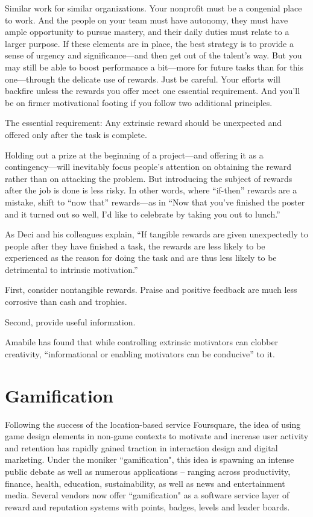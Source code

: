 Similar work for similar organizations. Your nonprofit must be a congenial place to work. And the people on your team must have autonomy, they must have ample opportunity to pursue mastery, and their daily duties must relate to a larger purpose. If these elements are in place, the best strategy is to provide a sense of urgency and significance—and then get out of the talent’s way.
But you may still be able to boost performance a bit—more for future tasks than for this one—through the delicate use of rewards. Just be careful. Your efforts will backfire unless the rewards you offer meet one essential requirement. And you’ll be on firmer motivational footing if you follow two additional principles.

The essential requirement: Any extrinsic reward should be unexpected and offered only after the task is complete.

Holding out a prize at the beginning of a project—and offering it as a contingency—will inevitably focus people’s attention on obtaining the reward rather than on attacking the problem. But introducing the subject of rewards after the job is done is less risky.
In other words, where “if-then” rewards are a mistake, shift to “now that” rewards—as in “Now that you’ve finished the poster and it turned out so well, I’d like to celebrate by taking you out to lunch.”

As Deci and his colleagues explain, “If tangible rewards are given unexpectedly to people after they have finished a task, the rewards are less likely to be experienced as the reason for doing the task and are thus less likely to be detrimental to intrinsic motivation.”

First, consider nontangible rewards. Praise and positive feedback are much less corrosive than cash and trophies.

Second, provide useful information.

Amabile has found that while controlling extrinsic motivators can clobber creativity, “informational or enabling motivators can be conducive” to it.


\section{Gamification}

Following the success of the location-based service Foursquare, the idea of using game design elements in non-game contexts to motivate and increase user activity and retention has rapidly gained traction in interaction design and digital marketing. Under the moniker ``gamification", this idea is spawning an intense public debate as well as numerous applications – ranging across productivity, finance, health, education, sustainability, as well as news and entertainment media. Several vendors now offer ``gamification" as a software service layer of reward and reputation systems with points, badges, levels and leader boards.

